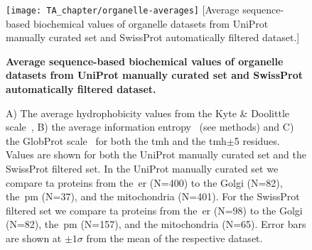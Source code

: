 \begin{figure}[!ht]
\centering
\texttt{[image: TA\_chapter/organelle-averages]}
[Average sequence-based biochemical values of organelle datasets from UniProt manually curated set and SwissProt automatically filtered dataset.]
{\textbf{Average sequence-based biochemical values of organelle datasets from UniProt manually curated set and SwissProt automatically filtered dataset.}

A) The average hydrophobicity values from the Kyte \& Doolittle scale~\cite{Kyte1982}, B) the average information entropy~\cite{Shannon1948} (see methods) and C) the GlobProt scale~\cite{Linding2003} for both the \gls{tmh} and the \gls{tmh}$\pm$5 residues.
Values are shown for both the UniProt manually curated set and the SwissProt filtered set.
In the UniProt manually curated set we compare \gls{ta} proteins from the~\gls{er} (N=400) to the Golgi (N=82), the~\gls{pm} (N=37), and the mitochondria (N=401).
For the SwissProt filtered set we compare \gls{ta} proteins from the~\gls{er} (N=98) to the Golgi (N=82), the~\gls{pm} (N=157), and the mitochondria (N=65).
Error bars are shown at $\pm 1 \sigma$ from the mean of the respective dataset.
}

\label{fig:average_organelle_factors_ta}
\end{figure}




